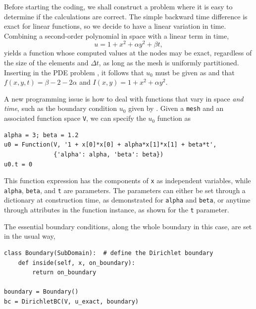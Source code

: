 Before starting the coding, we shall construct a problem where it is
easy to determine if the calculations are correct. The simple backward
time difference is exact for linear functions, so we decide to have
a linear variation in time. Combining a second-order polynomial in space
with a linear term in time,
\begin{equation} u = 1 + x^2 + \alpha y^2 + \beta t,
\label{langtangen:diffusion:pde1:u0test}
\end{equation}
yields a function whose computed values at the nodes may be exact,
regardless of the size of the elements and $\Delta t$, as long as the
mesh is uniformly partitioned.
Inserting  in the PDE problem
, it follows that $u_0$ must be given as
 and that $f(x,y,t)=\beta - 2 - 2\alpha$
and $I(x,y)=1+x^2+\alpha y^2$.


A new programming issue is
how to deal with functions that vary in space \emph{and time}, such as
the boundary condition $u_0$ given by .
Given a {\fontsize{12pt}{12pt}\texttt{mesh}} and an associated function space {\fontsize{12pt}{12pt}\texttt{V}}, we
can specify the $u_0$ function as
\begin{Verbatim}[fontsize=\fontsize{10pt}{10pt},tabsize=8,baselinestretch=1.05,
fontfamily=tt,xleftmargin=7mm]
alpha = 3; beta = 1.2
u0 = Function(V, '1 + x[0]*x[0] + alpha*x[1]*x[1] + beta*t',
              {'alpha': alpha, 'beta': beta})
u0.t = 0
\end{Verbatim}
\noindent
This function expression has the components of {\fontsize{12pt}{12pt}\texttt{x}} as independent
variables, while {\fontsize{12pt}{12pt}\texttt{alpha}}, {\fontsize{12pt}{12pt}\texttt{beta}}, and {\fontsize{12pt}{12pt}\texttt{t}} are parameters.
The parameters can either be set through a dictionary at construction time,
as demonstrated for {\fontsize{12pt}{12pt}\texttt{alpha}} and {\fontsize{12pt}{12pt}\texttt{beta}}, or anytime through
attributes in the function
instance, as shown for the {\fontsize{12pt}{12pt}\texttt{t}} parameter.

The essential boundary conditions, along the whole boundary in this case,
are set in the usual way,
\begin{Verbatim}[fontsize=\fontsize{10pt}{10pt},tabsize=8,baselinestretch=1.05,
fontfamily=tt,xleftmargin=7mm]
class Boundary(SubDomain):  # define the Dirichlet boundary
    def inside(self, x, on_boundary):
        return on_boundary

boundary = Boundary()
bc = DirichletBC(V, u_exact, boundary)
\end{Verbatim}
\noindent


